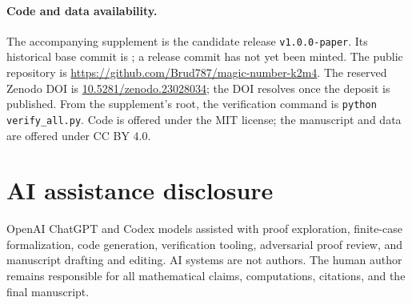 \documentclass[11pt]{article}
\newcommand{\1}{\mathbf 1}
\begin{document}
\paragraph{Code and data availability.}
The accompanying supplement is the candidate release
\texttt{v1.0.0-paper}.  Its historical base commit is
; a release commit has
not yet been minted.  The public repository is
\url{https://github.com/Brud787/magic-number-k2m4}.  The reserved
Zenodo DOI is
\href{https://doi.org/10.5281/zenodo.23028034}{10.5281/zenodo.23028034};
the DOI resolves once the deposit is published.  From the
supplement's root, the verification command is
\texttt{python verify\_all.py}.  Code is offered under the MIT license;
the manuscript and data are offered under CC BY 4.0.
\par\endgroup

\section*{AI assistance disclosure}
OpenAI ChatGPT and Codex models assisted with proof exploration,
finite-case formalization, code generation, verification tooling,
adversarial proof review, and manuscript drafting and editing.  AI systems
are not authors.  The human author remains responsible for all
mathematical claims, computations, citations, and the final manuscript.
\end{document}
